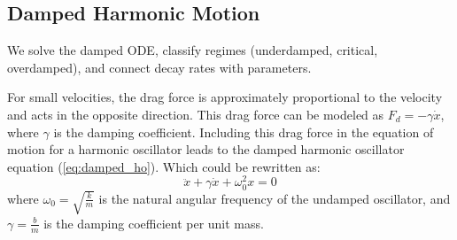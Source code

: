 \documentclass[11pt]{report}
\begin{document}
\subsection{Damped Harmonic Motion}
We solve the damped ODE, classify regimes (underdamped, critical, overdamped), and connect decay rates with parameters.
\begin{definition}
    For small velocities, the drag force is approximately proportional to the velocity and acts in the opposite direction. This drag force can be modeled as \( F_d = -\gamma \dot{x} \), where \( \gamma \) is the damping coefficient. Including this drag force in the equation of motion for a harmonic oscillator leads to the damped harmonic oscillator equation (\ref{eq:damped_ho}). Which could be rewritten as:
    \begin{equation}
        \ddot{x} + \gamma \dot{x} + \omega_0^2 x = 0
    \end{equation}
    where \( \omega_0 = \sqrt{\frac{k}{m}} \) is the natural angular frequency of the undamped oscillator, and \( \gamma = \frac{b}{m} \) is the damping coefficient per unit mass.
    

\end{definition}
\end{document}
